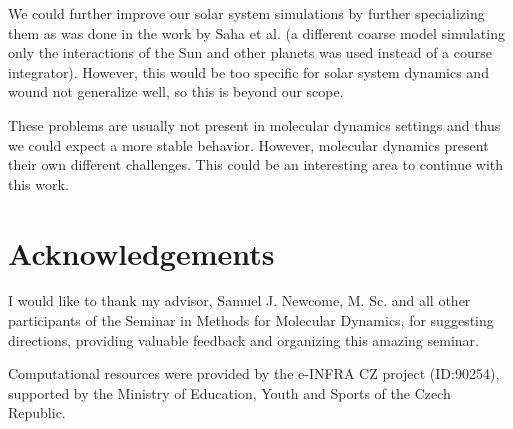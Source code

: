 \documentclass[conference]{IEEEtran}
\begin{document}
We could further improve our solar system simulations by further specializing them as was done in the work by Saha et al. \cite{parallelsolar} (a different coarse model simulating only the interactions of the Sun and other planets was used instead of a course integrator). However, this would be too specific for solar system dynamics and wound not generalize well, so this is beyond our scope.

These problems are usually not present in molecular dynamics settings and thus we could expect a more stable behavior. However, molecular dynamics present their own different challenges. This could be an interesting area to continue with this work.


\section*{Acknowledgements}

I would like to thank my advisor, Samuel J. Newcome, M. Sc. and all other participants of the Seminar in Methods for Molecular Dynamics, for suggesting directions, providing valuable feedback and organizing this amazing seminar.

Computational resources were provided by the e-INFRA CZ project (ID:90254),
supported by the Ministry of Education, Youth and Sports of the Czech Republic.
\end{document}
